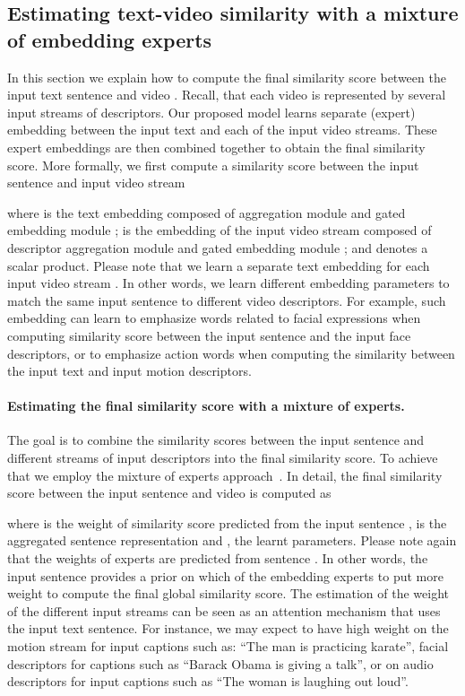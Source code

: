 \documentclass[runningheads]{llncs}
\begin{document}
\subsection{Estimating text-video similarity with a mixture of embedding experts}
In this section we explain how to compute the final similarity score between the input text sentence  and video . Recall, that each video is represented by several input streams  of descriptors. Our proposed model learns separate (expert) embedding between the input text and each of the input video streams. These expert embeddings are then combined together to obtain the final similarity score. More formally, we first compute a similarity score  between the input sentence  and input video stream 

where  is the text embedding composed of aggregation module  and gated embedding module ;   is the embedding of the input video stream  composed of descriptor aggregation module  and gated embedding module ; and  denotes a scalar product.  Please note that we learn a separate text embedding  for each input video stream . In other words, we learn different embedding parameters to match the same input sentence  to different video descriptors. For example, such embedding can learn to emphasize words related to facial expressions when computing similarity score between the input sentence and the input face descriptors, or to emphasize action words when computing the similarity between the input text and input motion descriptors. 


\paragraph{Estimating the final similarity score with a mixture of experts.}

The goal is to combine the similarity scores  between the input sentence  and different streams of input descriptors  into the final similarity score. To achieve that we employ the mixture of experts approach~\cite{jordan94mixture}. 
In detail, the final similarity score  between the input sentence  and video  is computed as 

where  is the weight of similarity score  predicted from the input sentence ,  is the aggregated sentence representation and ,  the learnt parameters. Please note again that the weights  of experts  are predicted from sentence . In other words, the input sentence provides a prior on which of the embedding experts to put more  weight to compute the final global similarity score. The estimation of the weight of the different input streams can be seen as an attention mechanism that uses the input text sentence. 
For instance,  we may expect to have high weight on the motion stream for input captions such as: ``The man is practicing karate'', facial descriptors for captions such as ``Barack Obama is giving a talk'',  or on audio descriptors for input captions such as ``The woman is laughing out loud''.  
\end{document}

